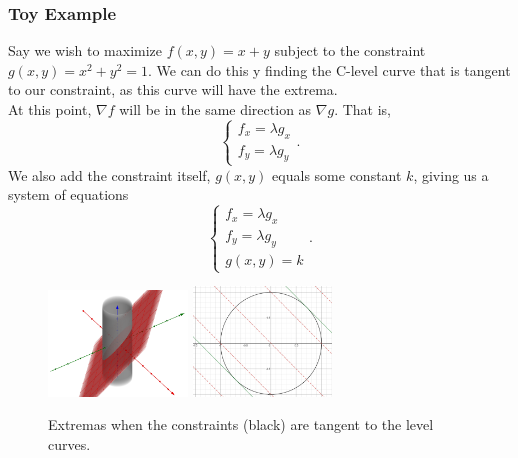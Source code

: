 \subsubsection{Toy Example}
\noindent
Say we wish to maximize $f(x,y) = x+y$ subject to the constraint $g(x,y) = x^2 + y^2 = 1$.
We can do this y finding the C-level curve that is tangent to our constraint, as this curve will have the extrema.\\
At this point, $\nabla f$ will be in the same direction as $\nabla g$.
That is,
\begin{equation*}
	\begin{cases} 
		f_x = \lambda g_x \\ 
		f_y = \lambda g_y
	\end{cases}.
\end{equation*}
We also add the constraint itself, $g(x,y)$ equals some constant $k$, giving us a system of equations
\begin{equation*}
	\begin{cases}
		f_x = \lambda g_x \\ 
		f_y = \lambda g_y \\ 
		g(x,y)=k 
	\end{cases}.
\end{equation*}

\begin{figure}[H]
	\centering
	\includegraphics[width=0.33\textwidth]{./differentialMultivariableCalculus/lagrange_slice.png}
	\includegraphics[width=0.33\textwidth]{./differentialMultivariableCalculus/lagrange_curves.png}
	\caption{Extremas when the constraints (black) are tangent to the level curves.}
\end{figure}